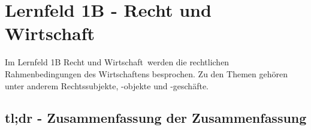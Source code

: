 \section{Lernfeld 1B - Recht und Wirtschaft}

Im Lernfeld 1B \ql Recht und Wirtschaft\qr\ werden die rechtlichen Rahmenbedingungen des Wirtschaftens besprochen. Zu den Themen gehören unter anderem Rechtssubjekte, -objekte und -geschäfte.

\subsection{tl;dr - Zusammenfassung der Zusammenfassung}






